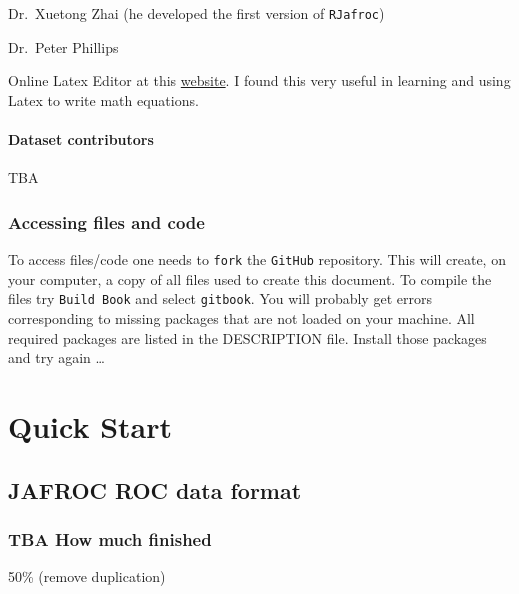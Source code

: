 \documentclass[
]{book}
\begin{document}
Dr.~Xuetong Zhai (he developed the first version of \texttt{RJafroc})

Dr.~Peter Phillips

Online Latex Editor at this \href{https://latexeditor.lagrida.com/}{website}. I found this very useful in learning and using Latex to write math equations.

\hypertarget{quick-start-index-dataset-contributors}{%
\subsection{Dataset contributors}\label{quick-start-index-dataset-contributors}}

TBA

\hypertarget{quick-start-index-how-to-access-files}{%
\section{Accessing files and code}\label{quick-start-index-how-to-access-files}}

To access files/code one needs to \texttt{fork} the \texttt{GitHub} repository. This will create, on your computer, a copy of all files used to create this document. To compile the files try \texttt{Build\ Book} and select \texttt{gitbook}. You will probably get errors corresponding to missing packages that are not loaded on your machine. All required packages are listed in the DESCRIPTION file. Install those packages and try again \ldots{}

\hypertarget{part-quick-start}{%
\part*{Quick Start}\label{part-quick-start}}

\hypertarget{quick-start-data-format}{%
\chapter{JAFROC ROC data format}\label{quick-start-data-format}}

\hypertarget{quick-start-data-format-how-much-finished}{%
\section{TBA How much finished}\label{quick-start-data-format-how-much-finished}}

50\% (remove duplication)
\end{document}
